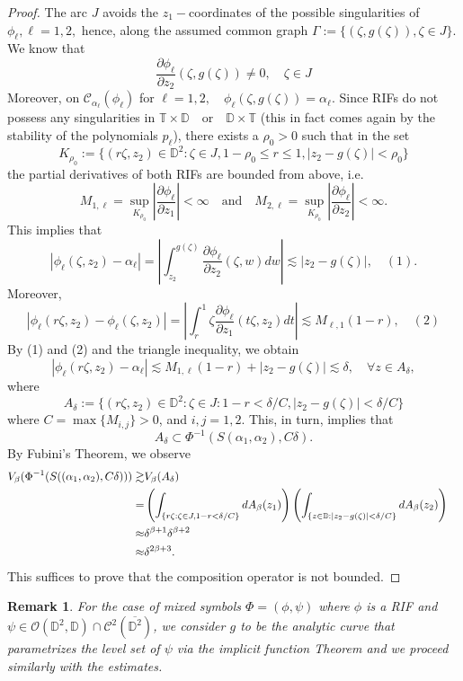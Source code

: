 \documentclass[12pt]{amsart}
\newtheorem{remark}[theorem]{Remark}
\numberwithin{equation}{section}
\begin{document}
\begin{proof}
The arc $J$ avoids the $z_1-$coordinates of the possible singularities of $\phi_\ell, \ell=1,2,$ hence, along the assumed common graph $\Gamma:=\{(\zeta,g(\zeta)),\zeta\in J\}.$ We know that  $$\frac{\partial{\phi_{\ell}}}{\partial z_2}(\zeta,g(\zeta))\neq 0, \quad \zeta\in J $$
Moreover, on $\mathcal{C}_{\alpha_{\ell}}(\phi_{\ell})$ for $\ell=1,2,\quad \phi_{\ell}(\zeta,g(\zeta))=\alpha_{\ell}.$ Since RIFs do not possess any singularities in $\mathbb{T}\times \mathbb{D} \quad \mathrm{or}\quad\mathbb{D}\times\mathbb{T}$ (this in fact comes again by the stability of the polynomials $p_{\ell}$), there exists a $\rho_0>0$ such that in the set
$$K_{\rho_0}:=\Bigg\{(r\zeta,z_2)\in\mathbb{D}^2:\zeta\in J,1-\rho_0\leq r\leq 1,|z_2-g(\zeta)|<\rho_0\Bigg\}$$ the partial derivatives of both RIFs are bounded from above, i.e.
$$M_{1,\ell}=\sup_{K_{\rho_0}}\left|\frac{\partial \phi_{\ell}}{\partial z_1}\right|<\infty \quad \mathrm{and} \quad M_{2,\ell}=\sup_{K_{\rho_0}}\left|\frac{\partial \phi_{\ell}}{\partial z_2}\right|<\infty.$$
This implies that
$$|\phi_{\ell}(\zeta,z_2)-\alpha_{\ell}|=\left|\int_{z_2}^{g(\zeta)}\frac{\partial{\phi}_{\ell}}{\partial z_2}(\zeta,w)dw\right|\lesssim|z_2-g(\zeta)|,\quad (1).$$
Moreover,
$$|\phi_{\ell}(r\zeta,z_2)-\phi_{\ell}(\zeta,z_2)|=\left|\int_{r}^{1}\zeta \frac{\partial \phi_{\ell}}{\partial z_1}(t\zeta,z_2)dt\right|\lesssim M_{\ell,1}(1-r), \quad (2)$$
By (1) and (2) and the triangle inequality, we obtain
$$|\phi_\ell(r\zeta,z_2)-\alpha_\ell|\lesssim M_{1,\ell}(1-r)+|z_2-g(\zeta)|\lesssim\delta, \quad \forall z\in A_{\delta},$$
where $$A_{\delta}:=\Bigg\{(r\zeta,z_2)\in\mathbb{D}^2:\zeta\in J:1-r<\delta/C,|z_2-g(\zeta)|<\delta/C\Bigg\}$$
where $C=\max\{M_{i,j}\}>0$, and $i,j=1,2.$ This, in turn, implies that
$$A_{\delta}\subset \Phi^{-1}(S(\alpha_1,\alpha_2),C\delta).$$ By Fubini's Theorem, we observe
\begin{align}
V_{\beta}(\Phi^{-1}(S((\alpha_1,\alpha_2),C\delta)))\gtrsim \notag& V_{\beta}(A_{\delta})&&\\ 
=&\left(\int_{\{r\zeta:\zeta\in J,1-r<\delta/C\}}dA_{\beta}(z_1)\right)\left(\int_{\{z\in\mathbb{D}:|z_2-g(\zeta)|<\delta/C\}}dA_{\beta}(z_2)\right) \notag&&\\ \notag
\approx&\delta^{\beta+1}\delta^{\beta+2}&&\\
\approx&\delta^{2\beta+3}. 
\end{align}
This suffices to prove that the composition operator is not bounded.
\end{proof}
\begin{remark} For the case of mixed symbols $\Phi=(\phi,\psi)$ where $\phi$ is a RIF and $\psi\in\mathcal{O}(\mathbb{D}^2,\mathbb{D})\cap \mathcal{C}^{2}(\overline{\mathbb{D}^2})$, we consider $g$ to be the analytic curve that parametrizes the level set of $\psi$ via the \textit{implicit function Theorem} and we proceed similarly with the estimates.
\end{remark}
\end{document}
